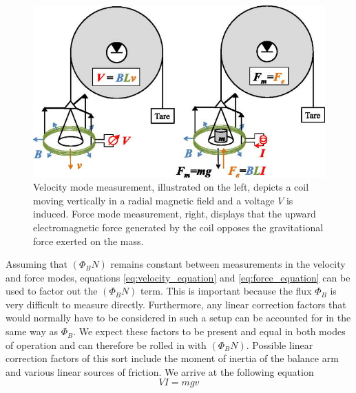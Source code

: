 \documentclass[aps,prstab,reprint,12pt]{revtex4-1}
\begin{document}
\begin{figure}[t]
     \centering\includegraphics[width=.95\linewidth]{figs/Force_Diagram.jpeg}
     \caption{Velocity mode measurement, illustrated on the left, depicts a coil moving vertically in a radial magnetic field and a voltage $V$ is induced. Force mode measurement, right, displays that the upward electromagnetic force generated by the coil opposes the gravitational force exerted on the mass. \cite{Chao2015}}\label{fig:Force}
\end{figure}


Assuming that $(\Phi_B N)$ remains constant between measurements in the velocity and force modes, equations \ref{eq:velocity_equation} and \ref{eq:force_equation} can be used to factor out the $(\Phi_B N)$ term. This is important because the flux $\Phi_B$ is very difficult to measure directly. Furthermore, any linear correction factors that would normally have to be considered in such a setup can be accounted for in the same way as $\Phi_B$. We expect these factors to be present and equal in both modes of operation and can therefore be rolled in with $(\Phi_B N)$. Possible linear correction factors of this sort include the moment of inertia of the balance arm and various linear sources of friction. We arrive at the following equation
\begin{equation}\label{eq:watt_equation}
    VI = mgv
\end{equation}
\end{document}
